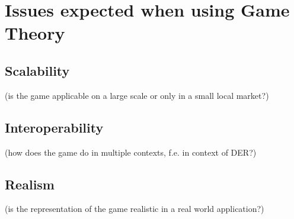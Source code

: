\section{Issues expected when using Game Theory}


\subsection{Scalability}
(is the game applicable on a large scale or only in a small local market?)
\subsection{Interoperability}
(how does the game do in multiple contexts, f.e. in context of DER?)
\subsection{Realism}
(is the representation of the game realistic in a real world application?)
